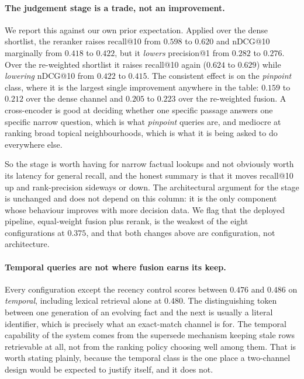 \documentclass[10pt,twocolumn]{article}
\begin{document}
\paragraph{The judgement stage is a trade, not an improvement.}
We report this against our own prior expectation. Applied over the dense
shortlist, the reranker raises recall@10 from $0.598$ to $0.620$ and nDCG@10
marginally from $0.418$ to $0.422$, but it \emph{lowers} precision@1 from $0.282$
to $0.276$. Over the re-weighted shortlist it raises recall@10 again
($0.624$ to $0.629$) while \emph{lowering} nDCG@10 from $0.422$ to $0.415$. The
consistent effect is on the \emph{pinpoint} class, where it is the largest single
improvement anywhere in the table: $0.159$ to $0.212$ over the dense channel and
$0.205$ to $0.223$ over the re-weighted fusion. A cross-encoder is good at
deciding whether one specific passage answers one specific narrow question, which
is what \emph{pinpoint} queries are, and mediocre at ranking broad topical
neighbourhoods, which is what it is being asked to do everywhere else.

So the stage is worth having for narrow factual lookups and not obviously worth
its latency for general recall, and the honest summary is that it moves recall@10
up and rank-precision sideways or down. The architectural argument for the stage
is unchanged and does not depend on this column: it is the only component whose
behaviour improves with more decision data. We flag that the deployed pipeline,
equal-weight fusion plus rerank, is the weakest of the eight configurations at
$0.375$, and that both changes above are configuration, not architecture.

\paragraph{Temporal queries are not where fusion earns its keep.}
Every configuration except the recency control scores between $0.476$ and $0.486$
on \emph{temporal}, including lexical retrieval alone at $0.480$. The
distinguishing token between
one generation of an evolving fact and the next is usually a literal identifier,
which is precisely what an exact-match channel is for. The temporal capability
of the system comes from the supersede mechanism keeping stale rows retrievable
at all, not from the ranking policy choosing well among them. That is worth
stating plainly, because the temporal class is the one place a two-channel design
would be expected to justify itself, and it does not.
\end{document}
